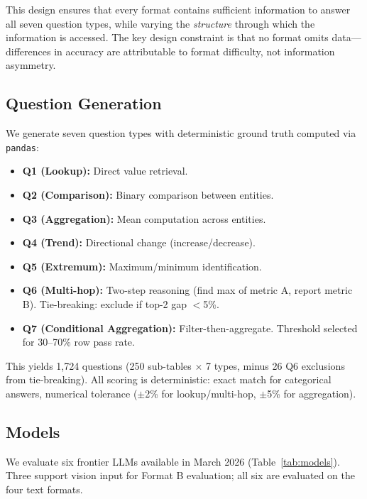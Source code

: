 \documentclass[11pt]{article}
\begin{document}
This design ensures that every format contains sufficient information to answer all seven question types, while varying the \emph{structure} through which the information is accessed. The key design constraint is that no format omits data---differences in accuracy are attributable to format difficulty, not information asymmetry.

\subsection{Question Generation}

We generate seven question types with deterministic ground truth computed via \texttt{pandas}:

\begin{itemize}
    \item \textbf{Q1 (Lookup):} Direct value retrieval.
    \item \textbf{Q2 (Comparison):} Binary comparison between entities.
    \item \textbf{Q3 (Aggregation):} Mean computation across entities.
    \item \textbf{Q4 (Trend):} Directional change (increase/decrease).
    \item \textbf{Q5 (Extremum):} Maximum/minimum identification.
    \item \textbf{Q6 (Multi-hop):} Two-step reasoning (find max of metric A, report metric B). Tie-breaking: exclude if top-2 gap $<$5\%.
    \item \textbf{Q7 (Conditional Aggregation):} Filter-then-aggregate. Threshold selected for 30--70\% row pass rate.
\end{itemize}

This yields 1,724 questions (250 sub-tables $\times$ 7 types, minus 26 Q6 exclusions from tie-breaking). All scoring is deterministic: exact match for categorical answers, numerical tolerance ($\pm$2\% for lookup/multi-hop, $\pm$5\% for aggregation).

\subsection{Models}

We evaluate six frontier LLMs available in March 2026 (Table~\ref{tab:models}). Three support vision input for Format B evaluation; all six are evaluated on the four text formats.
\end{document}

